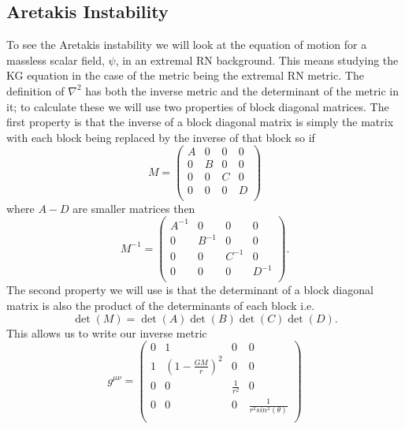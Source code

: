 \documentclass[12pt]{article}
\numberwithin{equation}{section}
\numberwithin{figure}{section}
\begin{document}
\subsection{Aretakis Instability} %
\label{sub:aretakis_instability}
To see the Aretakis instability we will look at the equation of motion for a massless scalar field, $\psi$, in an extremal RN background. This means studying the KG equation in the case of the metric being the extremal RN metric. The definition of $\nabla^{2}$ has both the inverse metric and the determinant of the metric in it; to calculate these we will use two properties of block diagonal matrices. The first property is that the inverse of a block diagonal matrix is simply the matrix with each block being replaced by the inverse of that block so if
\begin{equation}
		M= 
		\begin{pmatrix}
		A & 0 & 0 & 0\\
		0 & B & 0 & 0\\
		0 & 0 & C & 0\\
		0 & 0 & 0 & D\\
	\end{pmatrix}
\end{equation}
where $A-D$ are smaller matrices then
\begin{equation}
		M^{-1}= 
		\begin{pmatrix}
		A^{-1} & 0 & 0 & 0\\
		0 & B^{-1} & 0 & 0\\
		0 & 0 & C^{-1} & 0\\
		0 & 0 & 0 & D^{-1}\\
	\end{pmatrix}.
\end{equation}
The second property we will use is that the determinant of a block diagonal matrix is also the product of the determinants of each block i.e.
\begin{equation}
	\det(M)=\det(A)\det(B)\det(C)\det(D).
\end{equation}
This allows us to write our inverse metric 
\begin{equation}
	g^{\mu\nu}=
	\begin{pmatrix}
		0 & 1 & 0 & 0\\
		1 & (1- \frac{GM}{r})^{2} & 0 & 0\\
		0 & 0 & \frac{1}{r^{2}} & 0\\
		0 & 0 & 0 & \frac{1}{r^{2}sin^{2}(\theta)}\\
	\end{pmatrix}
\end{equation}
\end{document}
